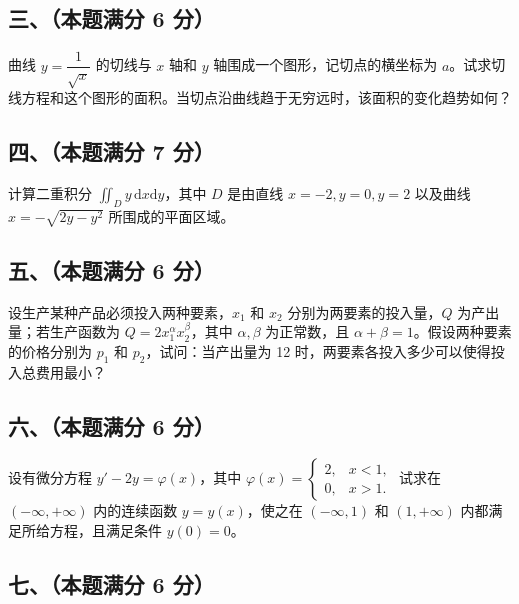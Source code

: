 \documentclass[UTF8,12pt]{ctexart}
\begin{document}
\subsection*{三、（本题满分 6 分）}

曲线 \(\displaystyle y=\dfrac{\displaystyle 1}{\displaystyle \sqrt x}\) 的切线与 \(\displaystyle x\) 轴和 \(\displaystyle y\) 轴围成一个图形，记切点的横坐标为 \(\displaystyle a\)。试求切线方程和这个图形的面积。当切点沿曲线趋于无穷远时，该面积的变化趋势如何？


\subsection*{四、（本题满分 7 分）}

计算二重积分 \(\displaystyle \iint_D y\,\mathrm dx\mathrm dy\)，其中 \(\displaystyle D\) 是由直线 \(\displaystyle x=-2,\allowbreak y=0,\allowbreak y=2\) 以及曲线 \(\displaystyle x=-\sqrt{2y-y^2}\) 所围成的平面区域。


\subsection*{五、（本题满分 6 分）}

设生产某种产品必须投入两种要素，\(\displaystyle x_1\) 和 \(\displaystyle x_2\) 分别为两要素的投入量，\(\displaystyle Q\) 为产出量；若生产函数为 \(\displaystyle Q=2x_1^\alpha x_2^\beta\)，其中 \(\displaystyle \alpha,\allowbreak \beta\) 为正常数，且 \(\displaystyle \alpha+\beta=1\)。假设两种要素的价格分别为 \(\displaystyle p_1\) 和 \(\displaystyle p_2\)，试问：当产出量为 12 时，两要素各投入多少可以使得投入总费用最小？


\subsection*{六、（本题满分 6 分）}

设有微分方程 \(\displaystyle y'-2y=\varphi(x)\)，其中 \(\displaystyle \varphi(x)=\begin{cases}2,\allowbreak &x<1,\allowbreak \\0,\allowbreak &x>1.\end{cases}\) 试求在 \(\displaystyle ( -\infty,\allowbreak +\infty )\) 内的连续函数 \(\displaystyle y=y(x)\)，使之在 \(\displaystyle ( -\infty,\allowbreak 1 )\) 和 \(\displaystyle (1,\allowbreak +\infty)\) 内都满足所给方程，且满足条件 \(\displaystyle y(0)=0\)。


\subsection*{七、（本题满分 6 分）}
\end{document}
